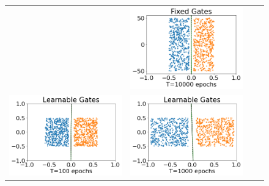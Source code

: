 \begin{figure}[h]
\begin{minipage}{1\columnwidth}
{\begin{tabular}{cccc}
&
\includegraphics[scale=0.2]{figs/fixed-1e4-ae100.png}
\\
\includegraphics[scale=0.2]{figs/learn-1e2-ae1.png}
&
\includegraphics[scale=0.2]{figs/learn-1e3-ae1.png}
&

\end{tabular}}
\end{minipage}
\end{figure}
